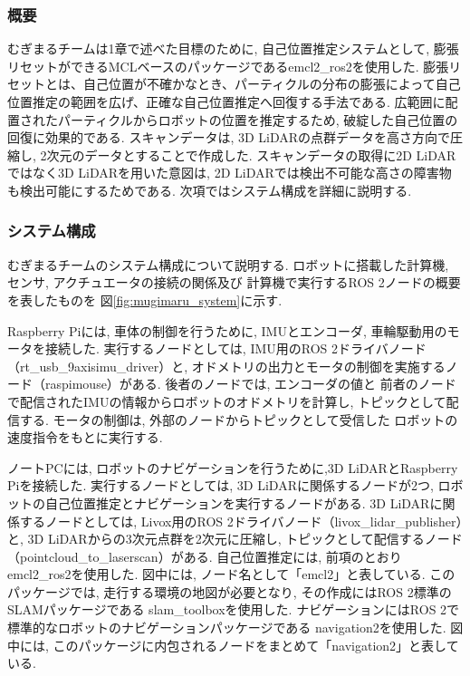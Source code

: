\subsubsection{概要}
むぎまるチームは1章で述べた目標のために, 
自己位置推定システムとして, 膨張リセット\cite{ueda2004iros}ができるMCLベースのパッケージであるemcl2\_ros2\cite{emcl2_ros2}を使用した. 
膨張リセットとは、自己位置が不確かなとき、パーティクルの分布の膨張によって自己位置推定の範囲を広げ、正確な自己位置推定へ回復する手法である. 
広範囲に配置されたパーティクルからロボットの位置を推定するため, 破綻した自己位置の回復に効果的である. 
スキャンデータは, 3D LiDARの点群データを高さ方向で圧縮し, 
2次元のデータとすることで作成した. 
スキャンデータの取得に2D LiDARではなく3D LiDARを用いた意図は, 
2D LiDARでは検出不可能な高さの障害物も検出可能にするためである. 
次項ではシステム構成を詳細に説明する. 

\subsubsection{システム構成}
むぎまるチームのシステム構成について説明する. 
ロボットに搭載した計算機, センサ, アクチュエータの接続の関係及び
計算機で実行するROS 2ノードの概要を表したものを
図\ref{fig:mugimaru_system}に示す. 

Raspberry Piには, 車体の制御を行うために, IMUとエンコーダ, 車輪駆動用のモータを接続した. 
実行するノードとしては, IMU用のROS 2ドライバノード（rt\_usb\_9axisimu\_driver）と, 
オドメトリの出力とモータの制御を実施するノード（raspimouse）がある. 
後者のノードでは, エンコーダの値と
前者のノードで配信されたIMUの情報からロボットのオドメトリを計算し, 
トピックとして配信する. 
モータの制御は, 外部のノードからトピックとして受信した
ロボットの速度指令をもとに実行する. 

ノートPCには, ロボットのナビゲーションを行うために,3D LiDARとRaspberry Piを接続した. 
実行するノードとしては, 3D LiDARに関係するノードが2つ, 
ロボットの自己位置推定とナビゲーションを実行するノードがある. 
3D LiDARに関係するノードとしては, Livox用のROS 2ドライバノード（livox\_lidar\_publisher）と, 
3D LiDARからの3次元点群を2次元に圧縮し, 
トピックとして配信するノード（pointcloud\_to\_laserscan）がある. 
自己位置推定には, 前項のとおりemcl2\_ros2を使用した. 
図中には, ノード名として「emcl2」と表している. 
このパッケージでは, 走行する環境の地図が必要となり, 
その作成にはROS 2標準のSLAMパッケージである
slam\_toolbox\cite{slam_toolbox}を使用した. 
ナビゲーションにはROS 2で標準的なロボットのナビゲーションパッケージである
navigation2\cite{nav2}を使用した. 
図中には, このパッケージに内包されるノードをまとめて「navigation2」と表している. 

